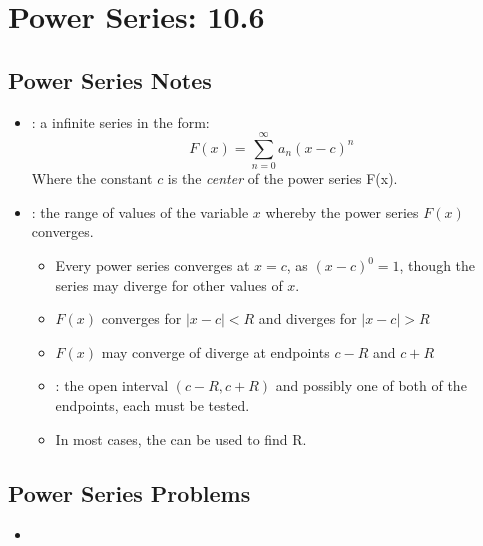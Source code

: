 \chapter{Power Series: 10.6}

\section{Power Series Notes}
\begin{itemize}
  \item {}: a infinite series in the form:
    \[%
    F(x) = \sum_{n=0}^{\infty} a_n (x - c)^n
    \]%
    Where the constant \(c\) is the \textit{center} of the power series F(x).

  \item {}: the range of values of the variable \(x\)
    whereby the power series \(F(x)\) converges.
    \begin{itemize}
      \item Every power series converges at \(x = c\), as \((x-c)^0 = 1\),
        though the series may diverge for other values of \(x\).

      \item \(F(x)\) converges for \(\left| x - c \right| < R \) and diverges
        for \(\left| x - c \right| > R \)

      \item \(F(x)\) may converge of diverge at endpoints \(c-R\) and \(c+R\)

      \item {}: the open interval \((c-R, c+R)\) and
        possibly one of both of the endpoints, each must be tested.

      \item In most cases, the  can be used to find R.

    \end{itemize}

\end{itemize}

\section{Power Series Problems}
\begin{itemize}
  \item
\end{itemize}

